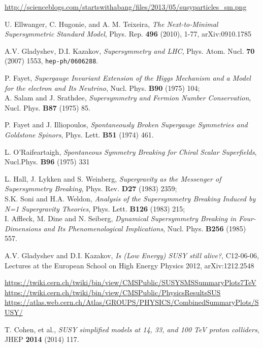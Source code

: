 \documentclass{cernyrep}
\begin{document}
\begin{thebibliography}{100}
\url{http://scienceblogs.com/startswithabang/files/2013/05/susyparticles_sm.png}

U. Ellwanger, C. Hugonie, and A. M. Teixeira,
{\em The Next-to-Minimal Supersymmetric Standard Model}, Phys. Rep. \textbf{496} (2010), 1-77, arXiv:0910.1785

A.V. Gladyshev, D.I. Kazakov,
\emph{Supersymmetry and LHC}, Phys. Atom. Nucl. \textbf{70} (2007) 1553,
\texttt{hep-ph/0606288}.

P. Fayet, {\em 	
Supergauge Invariant Extension of the Higgs Mechanism and a Model for the electron and Its Neutrino},  Nucl. Phys. {\bf B90} (1975) 104;\\
A. Salam and J. Srathdee, {\em Supersymmetry and Fermion Number Conservation}, Nucl. Phys. {\bf B87} (1975) 85.

P. Fayet and J. Illiopoulos,
{\em Spontaneously Broken Supergauge Symmetries and Goldstone Spinors}, Phys. Lett. {\bf B51} (1974) 461.

L. O'Raifeartaigh,
{\em Spontaneous Symmetry Breaking for Chiral Scalar Superfields}, Nucl.Phys. {\bf B96} (1975) 331

L. Hall, J. Lykken and S. Weinberg,
{\em Supergravity as the Messenger of Supersymmetry Breaking}, Phys. Rev. {\bf D27} (1983) 2359;\\
S.K. Soni and H.A. Weldon,
{\em Analysis of the Supersymmetry Breaking Induced by N=1 Supergravity Theories}, Phys. Lett. {\bf B126} (1983) 215;\\
I. Affleck, M. Dine and N. Seiberg,
{\em Dynamical Supersymmetry Breaking in Four-Dimensions and Its Phenomenological Implications}, Nucl. Phys. {\bf B256} (1985) 557.

A.V. Gladyshev and D.I. Kazakov, {\it Is (Low Energy) SUSY still alive?}, C12-06-06, Lectures at the European School on High Energy Physics 2012, arXiv:1212.2548

\url{https://twiki.cern.ch/twiki/bin/view/CMSPublic/SUSYSMSSummaryPlots7TeV}\\
\url{https://twiki.cern.ch/twiki/bin/view/CMSPublic/PhysicsResultsSUS}\\
\url{https://atlas.web.cern.ch/Atlas/GROUPS/PHYSICS/CombinedSummaryPlots/SUSY/}

T. Cohen, et al., {\it SUSY simplified models at 14, 33, and 100 TeV proton colliders},  JHEP {\bf 2014} (2014) 117.


\end{thebibliography}
\end{document}
